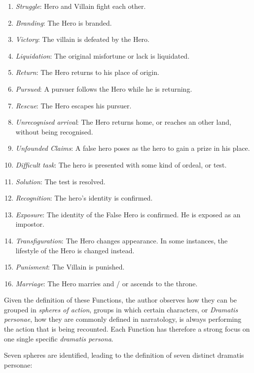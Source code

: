 \documentclass[12pt,a4paper,oneside]{report}
\begin{document}
\begin{enumerate}
\item \textit{Struggle}: Hero and Villain fight each other.
\item \textit{Branding}: The Hero is branded.
\item \textit{Victory}: The villain is defeated by the Hero.
\item \textit{Liquidation}: The original misfortune or lack is liquidated.
\item \textit{Return}: The Hero returns to his place of origin.
\item \textit{Pursued}:  A pursuer follows the Hero while he is returning.
\item \textit{Rescue}: The Hero escapes his pursuer.
\item \textit{Unrecognised arrival}: The Hero returns home, or reaches an other land, without being recognised.
\item \textit{Unfounded Claims}: A false hero poses as the hero to gain a prize in his place.
\item \textit{Difficult task}: The hero is presented with some kind of ordeal, or test.
\item \textit{Solution}: The test is resolved.
\item \textit{Recognition}: The hero's identity is confirmed.
\item \textit{Exposure}: The identity of the False Hero is confirmed. He is exposed as an impostor.
\item \textit{Transfiguration}: The Hero changes appearance. In some instances, the lifestyle of the Hero is changed instead.
\item \textit{Punisment}: The Villain is punished.
\item \textit{Marriage}: The Hero marries and / or ascends to the throne.

\end{enumerate}

Given the definition of these Functions, the author observes how they can be grouped in \textit{spheres of action}, groups in which certain characters,  or \textit{Dramatis personae}, how they are commonly defined in narratology, is always performing the action that is being recounted. Each Function has therefore a strong focus on one single specific \textit{dramatis persona}.

Seven spheres are identified, leading to the definition of seven distinct dramatis personae:
\end{document}
